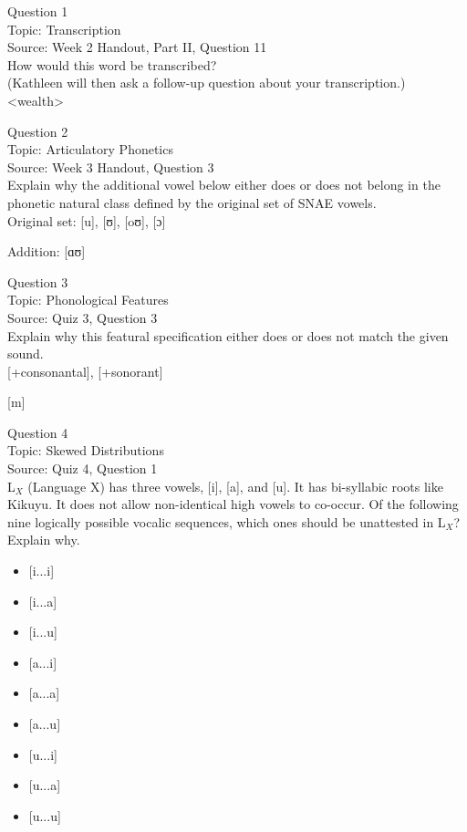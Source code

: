 \documentclass[12pt]{article}
\begin{document}
{\large Question 1}\\

Topic: Transcription\\
Source: Week 2 Handout, Part II, Question 11\\

How would this word be transcribed?\\ (Kathleen will then ask a follow-up question about your transcription.)\\

<wealth>


\newpage

{\large Question 2}\\

Topic: Articulatory Phonetics\\
Source: Week 3 Handout, Question 3\\

Explain why the additional vowel below either does or does not belong in the phonetic natural class defined by the original set of SNAE vowels.\\

Original set: {[u]}, {[ʊ]}, {[oʊ]}, {[ɔ]}

Addition: {[ɑʊ]}


\newpage

{\large Question 3}\\

Topic: Phonological Features\\
Source: Quiz 3, Question 3\\

Explain why this featural specification either does or does not match the given sound.\\

{[+consonantal]}, {[+sonorant]}

{[m]}


\newpage

{\large Question 4}\\

Topic: Skewed Distributions\\
Source: Quiz 4, Question 1\\

L$_X$ (Language X) has three vowels, [i], [a], and [u]. It has bi-syllabic roots like Kikuyu. It does not allow non-identical high vowels to co-occur. Of the following nine logically possible vocalic sequences, which ones should be unattested in L$_X$? Explain why.\\

\begin{itemize} \item {[i...i]} \item {[i...a]} \item {[i...u]} \item {[a...i]} \item {[a...a]} \item {[a...u]} \item {[u...i]} \item {[u...a]} \item {[u...u]} \end{itemize}
\end{document}
